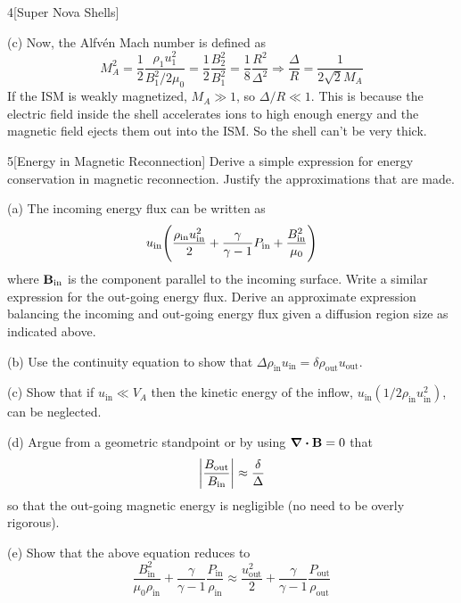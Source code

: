 \documentclass[12pt]{article}
\begin{document}
\begin{problem}{4}[Super Nova Shells]
\begin{solution}
(c) Now, the Alfvén Mach number is defined as
\begin{equation}
    M_A^2=\frac12\frac{\rho_1u_1^2}{B_1^2/2\mu_0}
    =\frac12\frac{B_2^2}{B_1^2}
    =\frac18\frac{R^2}{\Delta^2}
    \Rightarrow\frac{\Delta}{R}=\frac1{2\sqrt2 M_A}
\end{equation}
If the ISM is weakly magnetized, $M_A\gg 1$, so $\Delta /R\ll 1$. This is
because the electric field inside the shell accelerates ions to high enough
energy and the magnetic field ejects them out into the ISM. So the shell can't
be very thick.
\end{solution}
\end{problem}
\begin{problem}{5}[Energy in Magnetic Reconnection]
Derive a simple expression for energy conservation in magnetic reconnection.
Justify the approximations that are made.

(a) The incoming energy flux can be written as
\begin{equation}\label{p5a:e_in}
    u_{\text{in}}\qty(\frac{\rho_{\text{in}}
    u_{\text{in}}^2}{2}+\frac{\gamma}{\gamma-1}P_\text{in}+\frac{B_{\text{in}}^2}{\mu_0}) 
\end{equation}
where $\vb{B}_\text{in}$ is the component parallel to the incoming surface.
Write a similar expression for the out-going energy flux. Derive an approximate
expression balancing the incoming and out-going energy flux given a diffusion
region size as indicated above.

(b) Use the continuity equation to show that $\Delta
\rho_{\text{in}}u_{\text{in}}=\delta\rho_{\text{out}}u_{\text{out}}$.

(c) Show that if $u_{\text{in}}\ll V_A$ then the kinetic energy of the inflow,
$u_{\text{in}}(1 /2\rho_{\text{in}}u_{\text{in}}^2)$, can be neglected.

(d) Argue from a geometric standpoint or by using $\div{\vb{B}}=0$ that
\begin{equation}
    \abs{\frac{B_{\text{out}}}{B_{\text{in}}}}\approx\frac\delta\Delta 
\end{equation}
so that the out-going magnetic energy is negligible (no need to be overly
rigorous).

(e) Show that the above equation reduces to
\begin{equation}
    \frac{B_{\text{in}}^2}{\mu_0\rho_{\text{in}}}+\frac{\gamma}{\gamma-1}\frac{P_{\text{in}}}{\rho_{\text{in}}}\approx\frac{u_{\text{out}}^2}{2}+\frac{\gamma}{\gamma-1}\frac{P_{\text{out}}}{\rho_{\text{out}}}  
\end{equation}


\end{problem}
\end{document}
